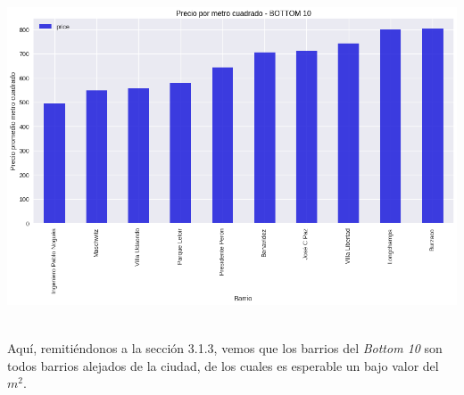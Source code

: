 \documentclass[a4paper, 10pt]{article}
\newcommand\tab[1][0.5cm]{\hspace*{#1}}
\begin{document}
				\begin{center}
   	    				\includegraphics[width=6in, height=3.9in]{images/m2Bottom10}
			  	\end{center}
				\tab Aquí, remitiéndonos a la sección 3.1.3, vemos que los barrios del \emph{Bottom 10} son todos barrios
				alejados de la ciudad, de los cuales es esperable un bajo valor del $m^2$.
\end{document}
